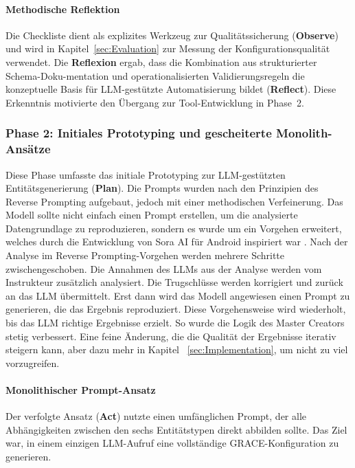 \paragraph{Methodische Reflektion}

Die Checkliste dient als explizites Werkzeug zur Qualitätssicherung (\textbf{Observe}) und wird in Kapitel~\ref{sec:Evaluation} zur Messung der Konfigurationsqualität verwendet. Die \textbf{Reflexion} ergab, dass die Kombination aus strukturierter Schema-Doku-mentation und operationalisierten Validierungsregeln die konzeptuelle Basis für LLM-gestützte Automatisierung bildet (\textbf{Reflect}). Diese Erkenntnis motivierte den Übergang zur Tool-Entwicklung in Phase~2.

\subsubsection{Phase 2: Initiales Prototyping und gescheiterte Monolith-Ansätze}
\label{subsubsec:Phase2}

Diese Phase umfasste das initiale Prototyping zur LLM-gestützten Entitätsgenerierung (\textbf{Plan}). Die Prompts wurden nach den Prinzipien des Reverse Prompting aufgebaut, jedoch mit einer methodischen Verfeinerung. Das Modell sollte nicht einfach einen Prompt erstellen, um die analysierte Datengrundlage zu reproduzieren, sondern es wurde um ein Vorgehen erweitert, welches durch die Entwicklung von Sora AI für Android inspiriert war \citep{openai:sora_android2025}. Nach der Analyse im Reverse Prompting-Vorgehen werden mehrere Schritte zwischengeschoben. Die Annahmen des LLMs aus der Analyse werden vom Instrukteur zusätzlich analysiert. Die Trugschlüsse werden korrigiert und zurück an das LLM übermittelt. Erst dann wird das Modell angewiesen einen Prompt zu generieren, die das Ergebnis reproduziert. Diese Vorgehensweise wird wiederholt, bis das LLM richtige Ergebnisse erzielt. So wurde die Logik des Master Creators stetig verbessert. Eine feine Änderung, die die Qualität der Ergebnisse iterativ steigern kann, aber dazu mehr in Kapitel~ \ref{sec:Implementation}, um nicht zu viel vorzugreifen. 

\paragraph{Monolithischer Prompt-Ansatz}

Der verfolgte Ansatz (\textbf{Act}) nutzte einen umfänglichen Prompt, der alle Abhängigkeiten zwischen den sechs Entitätstypen direkt abbilden sollte. Das Ziel war, in einem einzigen LLM-Aufruf eine vollständige GRACE-Konfiguration zu generieren.

